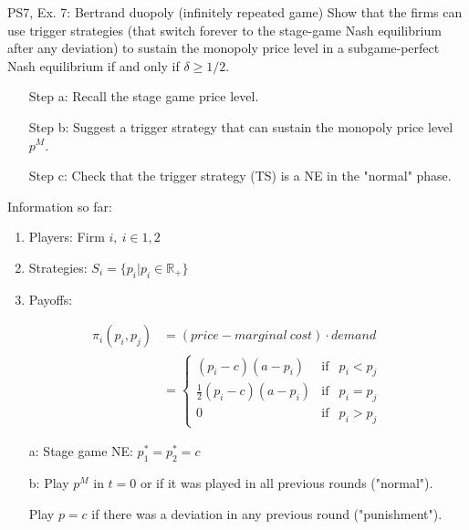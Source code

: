 \begin{frame}{PS7, Ex. 7: Bertrand duopoly (infinitely repeated game)}
    Show that the firms can use trigger strategies (that switch forever to the stage-game Nash equilibrium after any deviation) to sustain the monopoly price level in a subgame-perfect Nash equilibrium if and only if $\delta\geq1/2$.
    \vspace{-6pt}
    \begin{multicols}{2}
      \begin{itemize}
        \item[Step a:] Recall the stage game price level.
        \item[Step b:] Suggest a trigger strategy that can sustain the monopoly price level $p^M$.
        \item[Step c:] Check that the trigger strategy (TS) is a NE in the "normal" phase.
      \end{itemize}
      \vspace{-4pt}
      \vfill\null\columnbreak
      Information so far:
      \vspace{-4pt}
      \begin{enumerate}
        \item Players: Firm $i,\ i\in1,2$
        \item Strategies: $S_i=\{p_i|p_i\in\mathbb{R}_+\}$
        \item Payoffs:
      \end{enumerate}
      \vspace{-12pt}
      \begin{align*}
        \pi_i(p_i,p_j)&=(price-marginal\ cost)\cdot demand\\
                      &=\left\{\begin{array}{lcl}
          (p_i-c)(a-p_i)            & \text{if} & p_i<p_j\\
          \frac{1}{2}(p_i-c)(a-p_i) & \text{if} & p_i=p_j\\
          0                         & \text{if} & p_i>p_j
        \end{array}\right.
      \end{align*}
      \vspace{-16pt}
      \begin{itemize}
        \item[a:] Stage game NE: $p_1^*=p_2^*=c$
        \item[b:] Play $p^M$ in $t=0$ or if it was played in all previous rounds ("normal").
        \item[]   Play $p=c$ if there was a deviation in any previous round ("punishment").
      \end{itemize}
      \vfill\null
    \end{multicols}
\end{frame}
